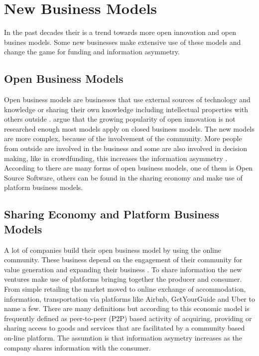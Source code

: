 \documentclass[a4paper, 11pt]{article}
\begin{document}
\section{New Business Models}
In the past decades their is a trend towards more open innovation and open busines models. Some new businesses make extensive use of these models and change the game for funding and information asymmetry.

\subsection{Open Business Models}

Open business models are businesses that use external sources of technology and knowledge or sharing their own knowledge including intellectual properties with others outside \citep{chesbrough2007companies}.
\cite{colombo2016open} argue that the growing popularity of open innovation is not researched enough most models apply on closed business models. The new models are more complex, because of the involvement of the community. More people from outside are involved in the business and some are also involved in decision making, like in crowdfunding, this increases the information asymmetry \citep{colombo2016open}. According to \cite{colombo2016open} there are many forms of open business models, one of them is Open Source Software, others can be found in the sharing economy and make use of platform business models.


\subsection{Sharing Economy and Platform Business Models}
A lot of companies build their open business model by using the online community. These business depend on the engagement of their community for value generation and expanding their business \citep{colombo2016open}. To share information the new ventures make use of platforms bringing together the producer and consumer. From simple retailing the market moved to online exchange of accommodation, information, transportation via platforms like Airbnb, GetYourGuide and Uber to name a few. There are many definitions but according to \cite{investopia} this economic model is frequently defined as peer-to-peer (P2P) based activity of acquiring, providing or sharing access to goods and services that are facilitated by a community based on-line platform. The assumtion is that information asymetry increases as the company shares information with the consumer.
\end{document}
